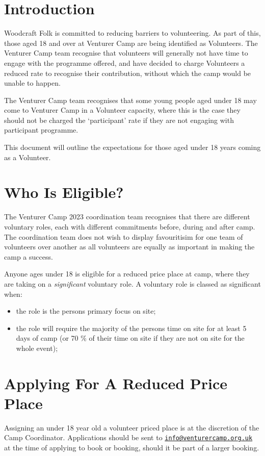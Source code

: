 \documentclass[a4paper, 11pt]{article}
\begin{document}
    \section{Introduction}
    Woodcraft Folk is committed to reducing barriers to volunteering. As part of this, those aged 18 and over at Venturer Camp are being identified as Volunteers. The Venturer Camp team recognise that volunteers will generally not have time to engage with the programme offered, and have decided to charge Volunteers a reduced rate to recognise their contribution, without which the camp would be unable to happen.

    The Venturer Camp team recognises that some young people aged under 18 may come to Venturer Camp in a Volunteer capacity, where this is the case they should not be charged the `participant' rate if they are not engaging with participant programme.

    This document will outline the expectations for those aged under 18 years coming as a Volunteer.

    \section{Who Is Eligible?}
    The Venturer Camp 2023 coordination team recognises that there are different voluntary roles, each with different commitments before, during and after camp. The coordination team does not wish to display favouritisim for one team of volunteers over another as all volunteers are equally as important in making the camp a success.

    Anyone ages under 18 is eligible for a reduced price place at camp, where they are taking on a \textit{significant} voluntary role. A voluntary role is classed as significant when:
    \begin{itemize}
        \item the role is the persons primary focus on site;
        \item the role will require the majority of the persons time on site for at least 5 days of camp (or 70 \% of their time on site if they are not on site for the whole event);
    \end{itemize}
    
    \section{Applying For A Reduced Price Place}
    Assigning an under 18 year old a volunteer priced place is at the discretion of the Camp Coordinator. Applications should be sent to \href{mailto:info@venturercamp.org.uk}{\texttt{info@venturercamp.org.uk}} at the time of applying to book or booking, should it be part of a larger booking.
\end{document}
